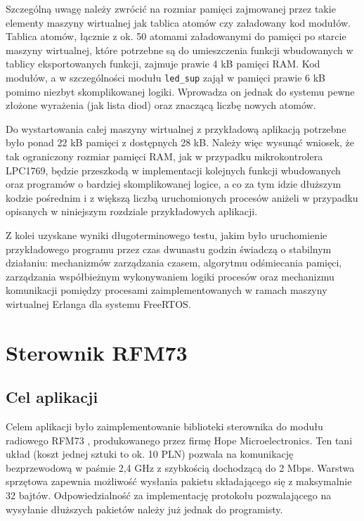 Szczególną uwagę należy zwrócić na rozmiar pamięci zajmowanej przez takie elementy maszyny wirtualnej jak tablica atomów czy załadowany kod modułów.
Tablica atomów, łącznie z ok. 50 atomami załadowanymi do pamięci po starcie maszyny wirtualnej, które potrzebne są do umieszczenia funkcji wbudowanych w tablicy eksportowanych funkcji, zajmuje prawie 4 kB pamięci RAM.  
Kod modułów, a w szczególności modułu \texttt{led\_sup} zajął w pamięci prawie 6 kB pomimo niezbyt skomplikowanej logiki. Wprowadza on jednak do systemu pewne złożone wyrażenia (jak lista diod) oraz znaczącą liczbę nowych atomów.

Do wystartowania całej maszyny wirtualnej z przykładową aplikacją potrzebne było ponad 22 kB pamięci z dostępnych 28 kB.
Należy więc wysunąć wniosek, że tak ograniczony rozmiar pamięci RAM, jak w przypadku mikrokontrolera LPC1769, będzie przeszkodą w implementacji kolejnych funkcji wbudowanych oraz programów o bardziej skomplikowanej logice, a co za tym idzie dłuższym kodzie pośrednim i z większą liczbą uruchomionych procesów aniżeli w przypadku opisanych w niniejszym rozdziale przykładowych aplikacji.

Z kolei uzyskane wyniki długoterminowego testu, jakim było uruchomienie przykładowego programu przez czas dwunastu godzin świadczą o stabilnym działaniu: mechanizmów zarządzania czasem, algorytmu odśmiecania pamięci, zarządzania współbieżnym wykonywaniem logiki procesów oraz mechanizmu komunikacji pomiędzy procesami zaimplementowanych w ramach maszyny wirtualnej Erlanga dla systemu FreeRTOS.

\section{Sterownik RFM73}
\label{sec:przykladyRfm}

\subsection{Cel aplikacji}

Celem aplikacji było zaimplementowanie biblioteki sterownika do modułu radiowego RFM73 \cite{RFM73}, produkowanego przez firmę Hope Microelectronics.
Ten tani układ (koszt jednej sztuki to ok. 10 PLN) pozwala na komunikację bezprzewodową w paśmie 2,4 GHz z szybkością dochodzącą do 2 Mbps. Warstwa sprzętowa zapewnia możliwość wysłania pakietu składającego się z maksymalnie 32 bajtów.
Odpowiedzialność za implementację protokołu pozwalającego na wysyłanie dłuższych pakietów należy już jednak do programisty.

